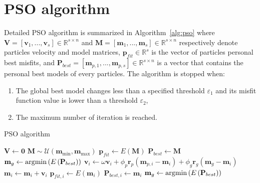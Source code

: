 \section{PSO algorithm}
\label{app:algo_pso}

Detailed PSO algorithm is summarized in Algorithm~\ref{alg:pso} where $\mathbf{V} = \left[ \mathbf{v}_{1}, ..., \mathbf{v}_{s} \right] \in \mathbb{R}^{s \times n}$ and $\mathbf{M} = \left[ \mathbf{m}_{1}, ..., \mathbf{m}_{s} \right] \in \mathbb{R}^{s \times n}$ respectively denote particles velocity and model matrices, $\mathbf{p}_{fit} \in \mathbb{R}^{s}$ is the vector of particles personal best misfits, and $\mathbf{P}_{best} = \left[ \mathbf{m}_{p,1}, ..., \mathbf{m}_{p,s} \right] \in \mathbb{R}^{s \times n}$ is a vector that contains the personal best models of every particles. The algorithm is stopped when:

\begin{enumerate}
	\item The global best model changes less than a specified threshold $\varepsilon_{1}$ and its misfit function value is lower than a threshold $\varepsilon_{2}$,
	\item The maximum number of iteration is reached.
\end{enumerate}

\begin{algorithm}[H]
	\centering
	\caption{PSO algorithm}
	\label{alg:pso}
	\begin{algorithmic}[1]
		\State $\mathbf{V} \gets \mathbf{0}$ 
		\State $\mathbf{M} \sim \mathcal{U} \left( \mathbf{m}_{\min}, \mathbf{m}_{\max} \right)$ 
		\State $\mathbf{p}_{fit} \gets E \left( \mathbf{M} \right)$ 
		\State $\mathbf{P}_{best} \gets \mathbf{M}$ 
		\State $\mathbf{m}_{g} \gets \operatorname*{\arg\!\min} \left( E \left( \mathbf{P}_{best} \right) \right)$ 
		\Repeat
				\State $\mathbf{v}_{i} \gets \omega \mathbf{v}_{i} + \phi_{p} \mathbf{r}_{p} \left( \mathbf{m}_{p,i} - \mathbf{m}_{i} \right) + \phi_{g} \mathbf{r}_{g} \left( \mathbf{m}_{g} - \mathbf{m}_{i} \right)$ 
				\State $\mathbf{m}_{i} \gets \mathbf{m}_{i} + \mathbf{v}_{i}$ 
					\State $\mathbf{p}_{fit,i} \gets E \left( \mathbf{m}_{i} \right)$ 
					\State $\mathbf{P}_{best,i} \gets \mathbf{m}_{i}$ 
				\EndIf
			\EndFor
			\State $\mathbf{m}_{g} \gets \operatorname*{\arg\!\min} \left( E \left( \mathbf{P}_{best} \right) \right)$ 
	\end{algorithmic}
\end{algorithm}